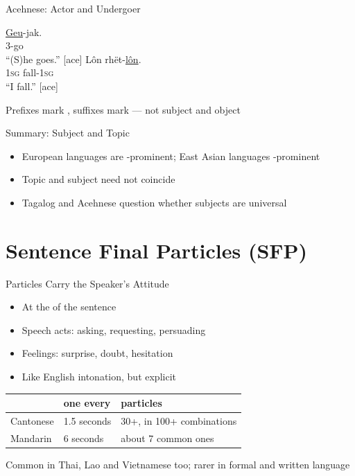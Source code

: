 \documentclass{beamer}
\begin{document}
\begin{frame}{Acehnese: Actor and Undergoer}
  \begin{exe}
    \ex
    \gll \ul{Geu}-jak. \\
         3-go \\
    \trans ``(S)he goes.'' [ace]
    \ex
    \gll Lôn rhët-\ul{lôn}. \\
         1\textsc{sg} fall-1\textsc{sg} \\
    \trans ``I fall.'' [ace]
  \end{exe}
  \vfill
  \large
  Prefixes mark , suffixes mark  --- not
  subject and object
\end{frame}

\begin{frame}{Summary: Subject and Topic}
  \Large
  \begin{itemize}
  \item European languages are -prominent;
    East Asian languages -prominent
  \item Topic and subject need not coincide
  \item Tagalog and Acehnese question whether subjects are universal
  \end{itemize}
\end{frame}

\section{Sentence Final Particles (SFP)}

\begin{frame}{Particles Carry the Speaker's Attitude}
  \Large
  \begin{itemize}
  \item At the  of the sentence
  \item Speech acts: asking, requesting, persuading
  \item Feelings: surprise, doubt, hesitation
  \item Like English intonation, but explicit
  \end{itemize}
  \vfill
  \begin{center}
  \begin{tabular}{lll}
    \toprule
    & one every & particles \\
    \midrule
    Cantonese & \alert{1.5} seconds & 30+, in 100+ combinations \\
    Mandarin  & \alert{6} seconds   & about 7 common ones \\
    \bottomrule
  \end{tabular}
  \end{center}
  \vfill
  \normalsize
  Common in Thai, Lao and Vietnamese too; rarer in formal and written
  language
\end{frame}
\end{document}
